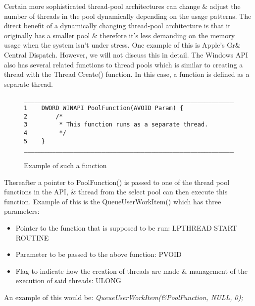 \documentclass[a4paper,11pt]{article}
\begin{document}
Certain more sophisticated thread-pool architectures can change \& adjust the number of threads in the pool dynamically depending on the usage patterns. The direct benefit of a dynamically changing thread-pool architecture is that it originally has a smaller pool \& therefore it's less demanding on the memory usage when the system isn't under stress. One example of this is Apple’s Gr\& Central Dispatch. However, we will not discuss this in detail.\cite{Operatingsystemconcepts}
\newline\indent The Windows API also has several related functions to thread pools which is similar to creating a thread with the Thread Create() function. In this case, a function is defined as a separate thread.\cite{Operatingsystemconcepts}
\begin{figure}[h]
    \centering
    \caption{Example of such a function}
    \label{fig:block_of_code_1}
    \begin{verbatim}
_________________________________________________________________
1    DWORD WINAPI PoolFunction(AVOID Param) {
2        /*
3         * This function runs as a separate thread.
4         */
5    }
_________________________________________________________________
    \end{verbatim}
\end{figure}
\newline\noindent Thereafter a pointer to PoolFunction() is passed to one of the thread pool functions in the API, \& thread from the select pool can then execute this function.\cite{Operatingsystemconcepts}
\newpage\noindent Example of this is the QueueUserWorkItem() which has three parameters:
\begin{itemize}
    \item Pointer to the function that is supposed to be run: LPTHREAD START ROUTINE
    \item Parameter to be passed to the above function: PVOID
    \item Flag to indicate how the creation of threads are made \& management of the execution of said threads: ULONG
\end{itemize}
\noindent An example of this would be: 
\newline\emph{QueueUserWorkItem(\&PoolFunction, NULL, 0);}
\end{document}
